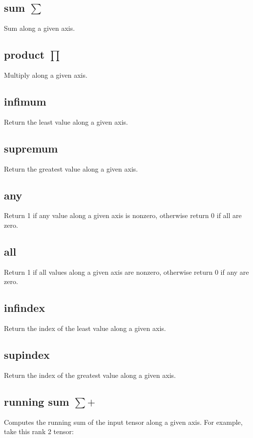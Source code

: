 \subsection{sum $\sum$}\label{Operation:sum} Sum along a given
axis.

\subsection{product $\prod$}\label{Operation:product} Multiply along a
given axis.

\subsection{infimum}\label{Operation:infimum} Return the least value
along a given axis.

\subsection{supremum}\label{Operation:supremum} Return the greatest value
along a given axis.

\subsection{any}\label{Operation:any} Return 1 if any value
along a given axis is nonzero, otherwise return 0 if all are zero.

\subsection{all}\label{Operation:all} Return 1 if all values
along a given axis are nonzero, otherwise return 0 if any are zero.

\subsection{infindex}\label{Operation:infIndex} Return the index of
the least value along a given axis.

\subsection{supindex}\label{Operation:supIndex} Return the index of
the greatest value along a given axis.

\subsection{running sum $\sum+$}\label{Operation:runningSum} Computes
the running sum of the input tensor along a given axis. For example,
take this rank 2 tensor:

